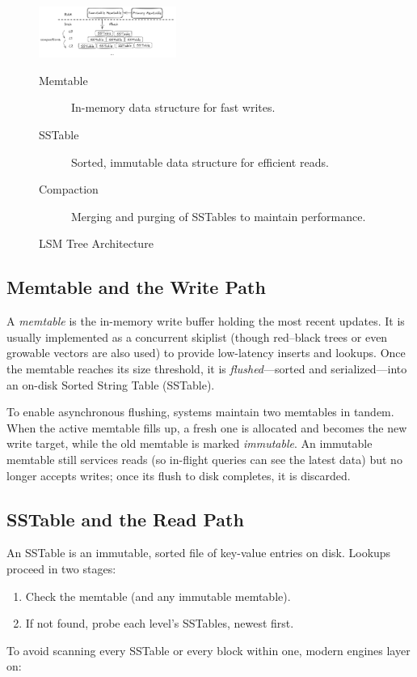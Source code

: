 \documentclass[sigconf]{acmart}
\begin{document}
      \begin{figure}[htbp]
      \centering
      \includegraphics[width=0.4\textwidth]{sstable.png}
      \caption{LSM Tree Architecture}\label{fig:LSM}
      \begin{description}
        \item[Memtable] In-memory data structure for fast writes.
        \item[SSTable] Sorted, immutable data structure for efficient reads.
        \item[Compaction] Merging and purging of SSTables to maintain performance.
      \end{description}
      \end{figure}

      \subsection{Memtable and the Write Path}
      A \emph{memtable} is the in-memory write buffer holding the most recent updates.  It is usually implemented as a concurrent skiplist (though red–black trees or even growable vectors are also used) to provide low-latency inserts and lookups.  Once the memtable reaches its size threshold, it is \emph{flushed}—sorted and serialized—into an on-disk Sorted String Table (SSTable).

      To enable asynchronous flushing, systems maintain two memtables in tandem.  When the active memtable fills up, a fresh one is allocated and becomes the new write target, while the old memtable is marked \emph{immutable}.  An immutable memtable still services reads (so in-flight queries can see the latest data) but no longer accepts writes; once its flush to disk completes, it is discarded.

      \subsection{SSTable and the Read Path}
      An SSTable is an immutable, sorted file of key-value entries on disk.  Lookups proceed in two stages:
      \begin{enumerate}
        \item Check the memtable (and any immutable memtable).
        \item If not found, probe each level's SSTables, newest first.
      \end{enumerate}
      To avoid scanning every SSTable or every block within one, modern engines layer on:
\end{document}
